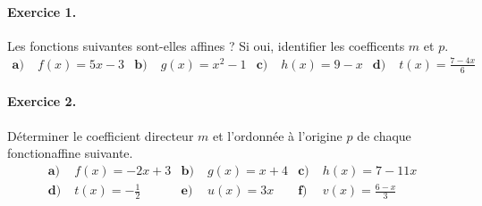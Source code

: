 \documentclass[11pt]{article}
\begin{document}

\paragraph{Exercice 1.} Les fonctions suivantes sont-elles affines ? Si oui,
identifier les coefficents $m$ et $p$.
\begin{align*}
  \textbf{a)}\;& f(x) = 5x-3 &
  \textbf{b)}\;& g(x) = x^2-1 &
  \textbf{c)}\;& h(x) = 9-x &
  \textbf{d)}\;& t(x) = \frac{7-4x}{6}
\end{align*}

\paragraph{Exercice 2.} Déterminer le coefficient directeur $m$ et l'ordonnée à
l'origine $p$ de chaque fonctionaffine suivante.
\begin{align*}
  \textbf{a)}\;& f(x) = -2x+3 &
  \textbf{b)}\;& g(x) = x+4 &
  \textbf{c)}\;& h(x) = 7-11x \\
  \textbf{d)}\;& t(x) = -\frac{1}{2} &
  \textbf{e)}\;& u(x) = 3x &
  \textbf{f)}\;& v(x) = \frac{6-x}{3}
\end{align*}
\end{document}
